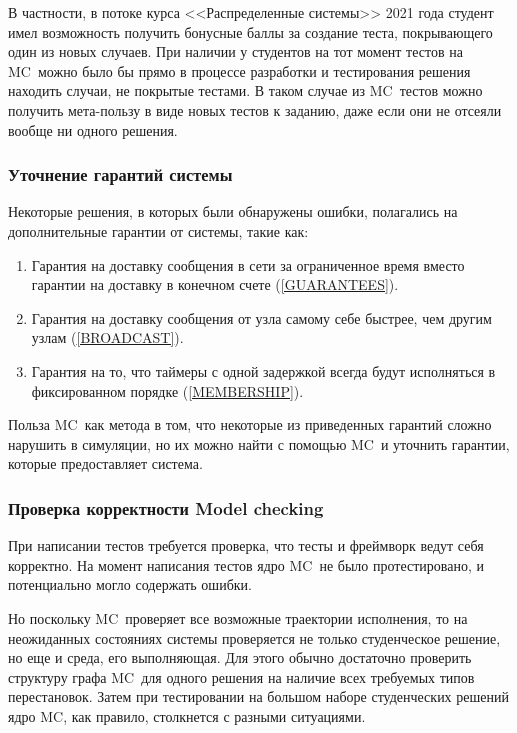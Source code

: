\documentclass[a4paper,12pt]{extarticle}
\newcommand{\mc}[0]{MC}
\begin{document}
В частности, в потоке курса <<Распределенные системы>> 2021 года студент имел возможность получить бонусные баллы за создание теста, покрывающего один из новых случаев.
При наличии у студентов на тот момент тестов на \mc\ можно было бы прямо в процессе разработки и тестирования решения находить случаи, не покрытые тестами.
В таком случае из \mc\ тестов можно получить мета-пользу в виде новых тестов к заданию, даже если они не отсеяли вообще ни одного решения.

\subsubsection{Уточнение гарантий системы}

Некоторые решения, в которых были обнаружены ошибки, полагались на дополнительные гарантии от системы, такие как:

\begin{enumerate}
    \item Гарантия на доставку сообщения в сети за ограниченное время вместо гарантии на доставку в конечном счете (\cref{GUARANTEES}).
    \item Гарантия на доставку сообщения от узла самому себе быстрее, чем другим узлам (\cref{BROADCAST}).
    \item Гарантия на то, что таймеры с одной задержкой всегда будут исполняться в фиксированном порядке (\cref{MEMBERSHIP}).
\end{enumerate}

Польза \mc\ как метода в том, что некоторые из приведенных гарантий сложно нарушить в симуляции, но их можно найти с помощью \mc\ и уточнить гарантии, которые предоставляет система.

\subsubsection{Проверка корректности Model checking}

При написании тестов требуется проверка, что тесты и фреймворк ведут себя корректно.
На момент написания тестов ядро \mc\ не было протестировано, и потенциально могло содержать ошибки.

Но поскольку \mc\ проверяет все возможные траектории исполнения, то на неожиданных состояниях системы проверяется не только студенческое решение, но еще и среда, его выполняющая.
Для этого обычно достаточно проверить структуру графа \mc\ для одного решения на наличие всех требуемых типов перестановок.
Затем при тестировании на большом наборе студенческих решений ядро \mc, как правило, столкнется с разными ситуациями.
\end{document}
